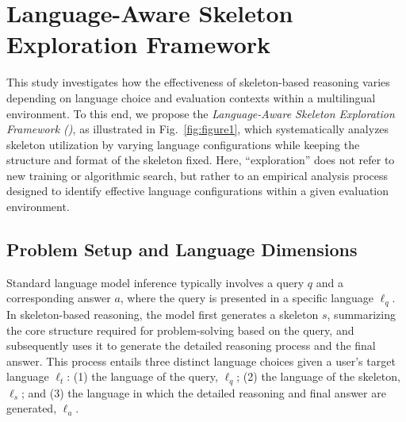 

\section{Language-Aware Skeleton Exploration Framework}


This study investigates how the effectiveness of skeleton-based reasoning varies depending on language choice and evaluation contexts within a multilingual environment. To this end, we propose the \emph{Language-Aware Skeleton Exploration Framework (\Lasef)}, as illustrated in Fig.~\ref{fig:figure1}, which systematically analyzes skeleton utilization by varying language configurations while keeping the structure and format of the skeleton fixed. Here, ``exploration'' does not refer to new training or algorithmic search, but rather to an empirical analysis process designed to identify effective language configurations within a given evaluation environment.


\subsection{Problem Setup and Language Dimensions}

Standard language model inference typically involves a query $q$ and a corresponding answer $a$, where the query is presented in a specific language $\ell_q$. In skeleton-based reasoning, the model first generates a skeleton $s$, summarizing the core structure required for problem-solving based on the query, and subsequently uses it to generate the detailed reasoning process and the final answer. This process entails three distinct language choices given a user's target language $\ell_t$: (1) the language of the query, $\ell_q$; (2) the language of the skeleton, $\ell_s$; and (3) the language in which the detailed reasoning and final answer are generated, $\ell_a$.

